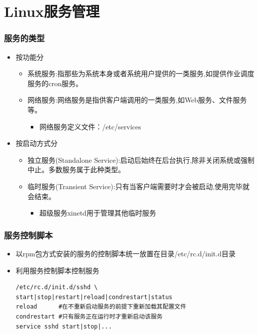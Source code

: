 \documentclass[xcolor=svgnames,presentation]{beamer}
\begin{document}
\section{Linux服务管理}
\label{sec-5}
\begin{frame}
\frametitle{服务的类型}
\label{sec-5-1}
\begin{itemize}

\item 按功能分
\label{sec-5-1-1}%
\begin{itemize}

\item 系统服务:指那些为系统本身或者系统用户提供的一类服务,如提供作业调度服务的cron服务。
\label{sec-5-1-1-1}%

\item 网络服务:网络服务是指供客户端调用的一类服务,如Web服务、文件服务等。
\label{sec-5-1-1-2}%
\begin{itemize}

\item 网络服务定义文件：/etc/services
\label{sec-5-1-1-2-1}%
\end{itemize} %
\end{itemize} %

\item 按启动方式分
\label{sec-5-1-2}%
\begin{itemize}

\item 独立服务(Standalone Service):启动后始终在后台执行,除非关闭系统或强制中止。多数服务属于此种类型。
\label{sec-5-1-2-1}%

\item 临时服务(Transient Service):只有当客户端需要时才会被启动,使用完毕就会结束。
\label{sec-5-1-2-2}%
\begin{itemize}

\item 超级服务xinetd用于管理其他临时服务
\label{sec-5-1-2-2-1}%
\end{itemize} %
\end{itemize} %
\end{itemize} %
\end{frame}
\begin{frame}[fragile]
\frametitle{服务控制脚本}
\label{sec-5-2}
\begin{itemize}

\item 以rpm包方式安装的服务的控制脚本统一放置在目录/etc/rc.d/init.d目录
\label{sec-5-2-1}%

\item 利用服务控制脚本控制服务\\
\label{sec-5-2-2}%
\begin{verbatim}
/etc/rc.d/init.d/sshd \
start|stop|restart|reload|condrestart|status
reload      #在不重新启动服务的前提下重新加载其配置文件
condrestart #只有服务正在运行时才重新启动该服务
service sshd start|stop|...
\end{verbatim}
\end{itemize} %
\end{frame}
\end{document}
